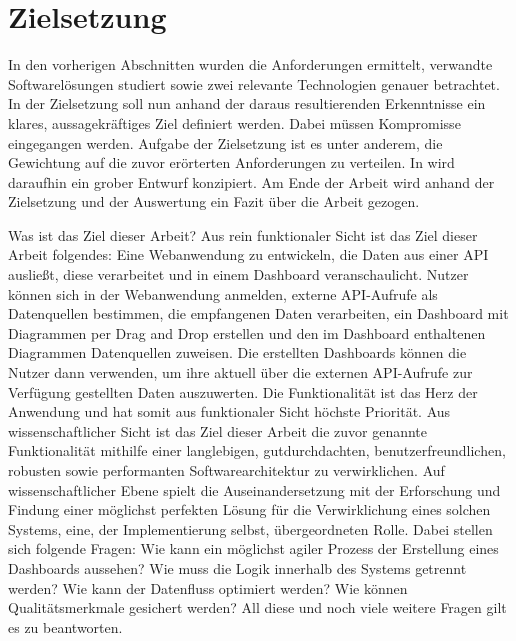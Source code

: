 \section{Zielsetzung}
\label{sec:zielsetzung}
In den vorherigen Abschnitten wurden die Anforderungen ermittelt, verwandte Softwarelösungen
studiert sowie zwei relevante Technologien genauer betrachtet. In der Zielsetzung soll nun
anhand der daraus resultierenden Erkenntnisse ein klares, aussagekräftiges Ziel definiert werden.
Dabei müssen Kompromisse eingegangen werden. Aufgabe der Zielsetzung ist es unter anderem,
die Gewichtung auf die zuvor erörterten Anforderungen zu verteilen. In 
wird daraufhin ein grober Entwurf konzipiert. Am Ende der Arbeit wird anhand der Zielsetzung
und der Auswertung ein Fazit über die Arbeit gezogen.

Was ist das Ziel dieser Arbeit? Aus rein funktionaler Sicht ist das Ziel dieser Arbeit
folgendes: Eine Webanwendung zu entwickeln, die Daten aus einer API ausließt,
diese verarbeitet und in einem Dashboard veranschaulicht. Nutzer können sich
in der Webanwendung anmelden, externe API-Aufrufe als Datenquellen bestimmen,
die empfangenen Daten verarbeiten, ein Dashboard mit Diagrammen per Drag and Drop erstellen
und den im Dashboard enthaltenen Diagrammen Datenquellen zuweisen. Die erstellten
Dashboards können die Nutzer dann verwenden, um ihre aktuell über die externen 
API-Aufrufe zur Verfügung gestellten Daten auszuwerten. Die Funktionalität
ist das Herz der Anwendung und hat somit aus funktionaler Sicht höchste Priorität.
Aus wissenschaftlicher Sicht ist das Ziel dieser Arbeit die zuvor genannte
Funktionalität mithilfe einer langlebigen, gutdurchdachten, benutzerfreundlichen,
robusten sowie performanten Softwarearchitektur zu verwirklichen. Auf wissenschaftlicher
Ebene spielt die Auseinandersetzung mit der Erforschung und Findung einer möglichst perfekten
Lösung für die Verwirklichung eines solchen Systems, eine, der Implementierung selbst,
übergeordneten Rolle. Dabei stellen sich folgende Fragen: Wie kann ein möglichst agiler
Prozess der Erstellung eines Dashboards aussehen? Wie muss die Logik innerhalb des Systems
getrennt werden? Wie kann der Datenfluss optimiert werden? Wie können Qualitätsmerkmale
gesichert werden? All diese und noch viele weitere Fragen gilt es zu beantworten.

